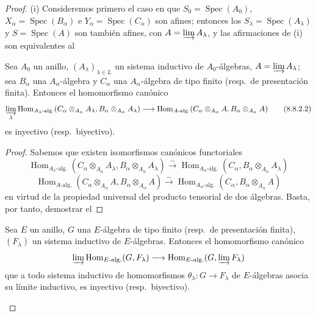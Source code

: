 \begin{proof}
(i) Consideremos primero el caso en que $S_0=\operatorname{Spec}(A_0)$, $X_\alpha=\operatorname{Spec}(B_\alpha)$ e $Y_\alpha=\operatorname{Spec}(C_\alpha)$ son afines; entonces los $S_\lambda=\operatorname{Spec}(A_\lambda)$ y $S=\operatorname{Spec}(A)$ son también afines, con $A=\varinjlim A_\lambda$, y las afirmaciones de (i) son equivalentes al

\begin{lemma}[8.8.2.1]
\label{IV.8.8.2.1}
Sea $A_0$ un anillo, $(A_\lambda)_{\lambda\in L}$ un sistema inductivo de $A_0$-álgebras, $A=\varinjlim A_\lambda$; sea $B_\alpha$ una $A_\alpha$-álgebra y $C_\alpha$ una $A_\alpha$-álgebra de tipo finito (resp.\ de presentación finita).
Entonces el homomorfismo canónico
\[
  \varinjlim_\lambda\operatorname{Hom}_{A_\lambda\text{-alg.}}(C_\alpha\otimes_{A_\alpha}A_\lambda,B_\alpha\otimes_{A_\alpha}A_\lambda)\to\operatorname{Hom}_{A\text{-alg.}}(C_\alpha\otimes_{A_\alpha}A,B_\alpha\otimes_{A_\alpha}A)
  \tag{8.8.2.2}\label{IV.8.8.2.2}
\]
es inyectivo (resp.\ biyectivo).
\end{lemma}

\begin{proof}
Sabemos que existen isomorfismos canónicos functoriales
\[
  \operatorname{Hom}_{A_\lambda\text{-alg.}}(C_\alpha\otimes_{A_\alpha}A_\lambda,B_\alpha\otimes_{A_\alpha}A_\lambda)\xrightarrow{\sim}\operatorname{Hom}_{A_\alpha\text{-alg.}}(C_\alpha,B_\alpha\otimes_{A_\alpha}A_\lambda)
\]
\[
  \operatorname{Hom}_{A\text{-alg.}}(C_\alpha\otimes_{A_\alpha}A,B_\alpha\otimes_{A_\alpha}A)\xrightarrow{\sim}\operatorname{Hom}_{A_\alpha\text{-alg.}}(C_\alpha,B_\alpha\otimes_{A_\alpha}A)
\]
en virtud de la propiedad universal del producto tensorial de dos álgebras.
Basta, por tanto, demostrar el
\end{proof}

\begin{lemma}[8.8.2.3]
\label{IV.8.8.2.3}
Sea $E$ un anillo, $G$ una $E$-álgebra de tipo finito (resp.\ de presentación finita), $(F_\lambda)$ un sistema inductivo de $E$-álgebras.
Entonces el homomorfismo canónico
\[
  \varinjlim\operatorname{Hom}_{E\text{-alg.}}(G,F_\lambda)\to\operatorname{Hom}_{E\text{-alg.}}(G,\varinjlim F_\lambda)
\]
que a todo sistema inductivo de homomorfismos $\theta_\lambda:G\to F_\lambda$ de $E$-álgebras asocia su límite inductivo, es inyectivo (resp.\ biyectivo).
\end{lemma}


\end{proof}

